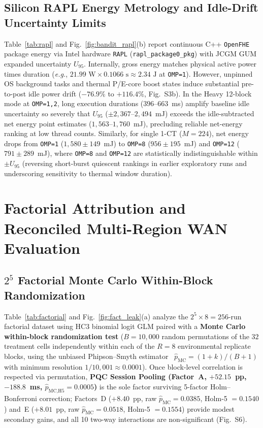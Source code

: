 \documentclass[10pt,journal,compsoc]{IEEEtran}
\begin{document}
\subsection{Silicon RAPL Energy Metrology and Idle-Drift Uncertainty Limits}

Table~\ref{tab:rapl} and Fig.~\ref{fig:bandit_rapl}(b) report continuous C++ \texttt{OpenFHE} package energy via Intel hardware \texttt{RAPL} (\nolinkurl{rapl_package0_pkg}) with JCGM GUM~\cite{bipm2008gum,david2010rapl} expanded uncertainty $U_{95}$. Internally, gross energy matches physical active power times duration (\emph{e.g.}, $21.99\text{ W} \times 0.1066\text{ s} \approx 2.34\text{ J}$ at \texttt{OMP=1}). However, unpinned OS background tasks and thermal P/E-core boost states induce substantial pre-to-post idle power drift ($-76.9\%$ to $+116.4\%$, Fig.~S3b). In the Heavy 12-block mode at \texttt{OMP=1,2}, long execution durations ($396\text{--}663$~ms) amplify baseline idle uncertainty so severely that $U_{95}$ ($\pm 2{,}367\text{--}2{,}494$~mJ) exceeds the idle-subtracted net energy point estimates ($1{,}563\text{--}1{,}760$~mJ), precluding reliable net-energy ranking at low thread counts. Similarly, for single 1-CT ($M=224$), net energy drops from \texttt{OMP=1} ($1{,}580 \pm 149$~mJ) to \texttt{OMP=8} ($956\pm 195$~mJ) and \texttt{OMP=12} ($791\pm 289$~mJ), where \texttt{OMP=8} and \texttt{OMP=12} are statistically indistinguishable within $\pm U_{95}$ (reversing short-burst quiescent rankings in earlier exploratory runs and underscoring sensitivity to thermal window duration).

\section{Factorial Attribution and Reconciled Multi-Region WAN Evaluation}\label{sec:wan}
\subsection{\texorpdfstring{$2^5$}{2\^{}5} Factorial Monte Carlo Within-Block Randomization}

Table~\ref{tab:factorial} and Fig.~\ref{fig:fact_leak}(a) analyze the $2^5 \times 8 = 256$-run factorial dataset using HC3 binomial logit GLM paired with a \textbf{Monte Carlo within-block randomization test} ($B=10{,}000$ random permutations of the $32$ treatment cells independently within each of the $R=8$ environmental replicate blocks, using the unbiased Phipson--Smyth estimator~\cite{phipson2010permutation} $\hat{p}_{\text{MC}} = (1 + k)/(B + 1)$ with minimum resolution $1/10{,}001 \approx 0.0001$). Once block-level correlation is respected via permutation, \textbf{PQC Session Pooling (Factor~A, $+52.15$~pp, $-188.8$~ms, $\hat{p}_{\text{MC,H5}} = 0.0005$)} is the sole factor surviving 5-factor Holm--Bonferroni correction; Factors~D ($+8.40$~pp, raw $\hat{p}_{\text{MC}}=0.0385$, Holm-5 $= 0.1540$) and~E ($+8.01$~pp, raw $\hat{p}_{\text{MC}}=0.0518$, Holm-5 $= 0.1554$) provide modest secondary gains, and all 10 two-way interactions are non-significant (Fig.~S6).
\end{document}
